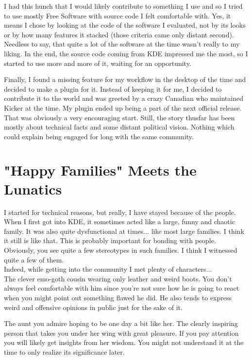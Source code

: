 I had this hunch that I would likely contribute to something I use and so I
tried to use mostly Free Software with source code I felt comfortable with.
Yes, it means I chose by looking at the code of the software I evaluated, not
by its looks or by how many features it stacked (those criteria came only
distant second). Needless to say, that quite a lot of the software at the time
wasn't really to my liking. In the end, the source code coming from KDE
impressed me the most, so I started to use more and more of it, waiting for an
opportunity.

Finally, I found a missing feature for my workflow in the desktop of the time
and decided to make a plugin for it. Instead of keeping it for me, I decided to
contribute it to the world and was greeted by a crazy Canadian who maintained
Kicker at the time. My plugin ended up being a part of the next official release. \\

That was obviously a very encouraging start. Still, the story thusfar has been  mostly about
technical facts and some distant political vision. Nothing which could explain
being engaged for long with the same community.

\section*{"Happy Families" Meets the Lunatics}
I started for technical reasons, but really, I have stayed because of the people.
When I first got into KDE, it sometimes acted like a large, funny and chaotic family.
It was also quite dysfunctional at times... like most large families. I think it
still is like that. This is probably important for bonding with people. Obviously,
you see quite a few stereotypes in such families. I think I witnessed quite a
few of them. \\

Indeed, while getting into the community I met plenty of characters... \\

The clever emo-goth cousin wearing only leather and weird boots. You don't
always feel comfortable with him since you're not sure how he is going to react
when you might point out something flawed he did. He also tends to express
weird and offensive opinions in public just for the sake of it.

The aunt you admire hoping to be one day a bit like her. The clearly inspiring
person that takes you under her wing with great pleasure. If you pay attention
you will likely get insights from her wisdom. You might not understand it at
the time to only realize its significance later.

